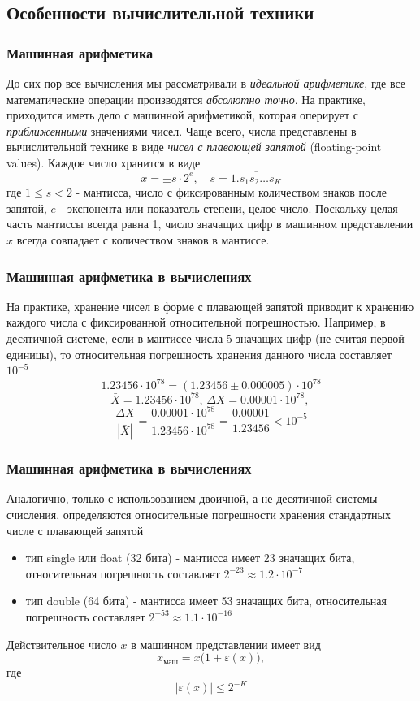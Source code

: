 \documentclass[aspectratio=169,unicode]{beamer}
\begin{document}
\subsection{Особенности вычислительной техники}
\begin{frame}
\frametitle{Машинная арифметика}
	До сих пор все вычисления мы рассматривали в \emph{идеальной арифметике}, где все математические
	операции производятся \emph{абсолютно точно}. На практике, приходится иметь дело с машинной арифметикой,
	которая оперирует с \emph{приближенными} значениями чисел. Чаще всего, числа представлены в
	вычислительной технике в виде \emph{чисел с плавающей запятой} (floating-point values). Каждое число хранится
	в виде
	\[
	x = \pm s \cdot 2^e, \quad s = \overline{1.s_1s_2\dots s_K}
	\]
	где $1 \leqslant s < 2$ - мантисса, число с фиксированным количеством знаков после запятой, $e$ - экспонента или показатель степени,
	целое число. Поскольку целая часть мантиссы всегда равна 1, число значащих цифр в машинном представлении $x$ всегда совпадает с
	количеством знаков в мантиссе.
\end{frame}

\begin{frame}
\frametitle{Машинная арифметика в вычислениях}
	На практике, хранение чисел в форме с плавающей запятой приводит к хранению каждого числа с фиксированной относительной погрешностью.
	Например, в десятичной системе, если в мантиссе числа 5 значащих цифр (не считая первой единицы),
	то относительная погрешность хранения данного числа составляет $10^{-5}$
	\[
	1.23456 \cdot 10^{78} = (1.23456 \pm 0.000005) \cdot 10^{78}
	\]
	\[
	\bar X = 1.23456 \cdot 10^{78}, \,
	\Delta X = 0.00001 \cdot 10^{78}, \,
	\]
	\[
	\frac{\Delta X}{|\bar X|} = \frac{0.00001\cdot 10^{78}}{1.23456\cdot 10^{78}} = \frac{0.00001}{1.23456} < 10^{-5}
	\]
\end{frame}

\begin{frame}
\frametitle{Машинная арифметика в вычислениях}
	Аналогично, только с использованием двоичной, а не десятичной системы счисления, определяются
	относительные погрешности хранения стандартных числе с плавающей запятой
	\begin{itemize}
		\item тип single или float (32 бита) - мантисса имеет 23 значащих бита,
		относительная погрешность составляет $2^{-23} \approx 1.2 \cdot 10^{-7}$
		\item тип double (64 бита) - мантисса имеет 53 значащих бита,
		относительная погрешность составляет $2^{-53} \approx 1.1 \cdot 10^{-16}$
	\end{itemize}

	Действительное число $x$ в машинном представлении имеет вид
	\[
		x_\text{маш} = x \big(1 + \varepsilon(x)\big),
	\]
	где \[|\varepsilon(x)| \leqslant 2^{-K}\]
\end{frame}
\end{document}
